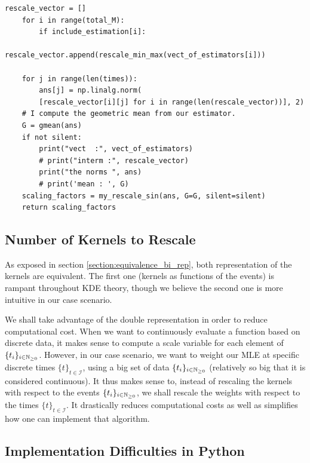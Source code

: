\documentclass[11pt]{book}
\newcommand{\sequence}[1]{\{ #1 \}_{ i \in \N} }
\newcommand{\sequencetime}{\{t\}_{t \in \mathcal I} }
\begin{document}
\begin{Verbatim}[fontsize=\footnotesize]
    rescale_vector = []
    for i in range(total_M):
        if include_estimation[i]:
            rescale_vector.append(rescale_min_max(vect_of_estimators[i]))

    for j in range(len(times)):
        ans[j] = np.linalg.norm(
        [rescale_vector[i][j] for i in range(len(rescale_vector))], 2)
    # I compute the geometric mean from our estimator.
    G = gmean(ans)
    if not silent:
        print("vect  :", vect_of_estimators)
        # print("interm :", rescale_vector)
        print("the norms ", ans)
        # print('mean : ', G)
    scaling_factors = my_rescale_sin(ans, G=G, silent=silent)
    return scaling_factors
\end{Verbatim}

\subsection{Number of Kernels to Rescale}
As exposed in section \ref{section:equivalence_bi_rep}, both representation of the kernels are equivalent. The first one (kernels as functions of the events) is rampant throughout KDE theory, though we believe the second one is more intuitive in our case scenario.

We shall take advantage of the double representation in order to reduce computational cost. When we want to continuously evaluate a function based on discrete data, it makes sense to compute a scale variable for each element of $\sequence{t_i}$. However, in our case scenario, we want to weight our MLE at specific discrete times $\sequencetime$, using a big set of data $\sequence{t_i}$ (relatively so big that it is considered continuous). It thus makes sense to, instead of rescaling the kernels with respect to the events $\sequence{t_i}$, we shall rescale the weights with respect to the times $\sequencetime$. It drastically reduces computational costs as well as simplifies how one can implement that algorithm.




\subsection{Implementation Difficulties in Python}
\end{document}
